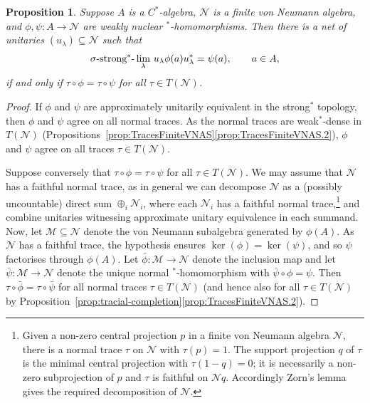 \documentclass[a4paper,11pt]{amsart}
\newtheorem{proposition}[theorem]{Proposition}
\theoremstyle{definition}
\numberwithin{equation}{section}
\numberwithin{theorem}{section}
\begin{document}
\begin{proposition}
	\label{prop:uniqueness-to-vNa}
	Suppose $A$ is a $C^*$-algebra, $\mathcal N$ is a finite von Neumann algebra, and $\phi, \psi \colon A \rightarrow \mathcal N$ are weakly nuclear $^*$-homomorphisms.  Then there is a net of unitaries $(u_\lambda) \subseteq \mathcal N$ such that 
	\begin{equation}\label{e9.2}
		\text{\rm $\sigma$-strong$^*$-}\lim_\lambda\, u_\lambda\phi(a) u_\lambda^* = \psi(a), \qquad a \in A,
	\end{equation}
	if and only if $\tau\circ\phi=\tau\circ\psi$ for all $\tau\in T(\mathcal N)$.
\end{proposition}

\begin{proof}
If $\phi$ and $\psi$ are approximately unitarily equivalent in the strong$^*$ topology, then $\phi$ and $\psi$ agree on all normal traces.  As the normal traces are weak$^*$-dense in $T(\mathcal N)$ (Propositions~\ref{prop:TracesFiniteVNAS}\ref{prop:TracesFiniteVNAS.2}), $\phi$ and $\psi$ agree on all traces $\tau \in T(\mathcal N)$.

 Suppose conversely that $\tau\circ\phi=\tau\circ\psi$ for all $\tau\in T(\mathcal N)$. We may assume that $\mathcal N$ has a faithful normal trace, as in general we can decompose $\mathcal N$ as a (possibly uncountable) direct sum $\oplus_i\mathcal N_i$, where each $\mathcal N_i$ has a faithful normal trace,\footnote{Given a non-zero central projection $p$ in a finite von Neumann algebra $\mathcal N$, there is a normal trace $\tau$ on $\mathcal N$ with $\tau(p)=1$. The support projection $q$ of $\tau$ is the minimal central projection with $\tau(1-q)=0$; it is necessarily a non-zero subprojection of $p$ and $\tau$ is faithful on $\mathcal Nq$.  Accordingly Zorn's lemma gives the required decomposition of $\mathcal N$.} and combine unitaries witnessing approximate unitary equivalence in each summand. Now, let $\mathcal M \subseteq \mathcal N$ denote the von Neumann subalgebra generated by $\phi(A)$. As $\mathcal N$ has a faithful trace, the hypothesis ensures \mbox{$\ker(\phi) = \ker(\psi)$}, and so $\psi$ factorises through $\phi(A)$.  Let $\bar\phi \colon \mathcal M \rightarrow \mathcal N$ denote the inclusion map and let $\bar \psi \colon \mathcal M \rightarrow \mathcal N$ denote the unique normal $^*$-homomorphism with $\bar \psi \circ \phi = \psi$.  Then $\tau\circ\bar\phi = \tau\circ\bar\psi$ for all normal traces $\tau \in T(\mathcal N)$ (and hence also for all $\tau \in T(\mathcal N)$ by Proposition~\ref{prop:tracial-completion}\ref{prop:TracesFiniteVNAS.2}).
	

\end{proof}
\end{document}
